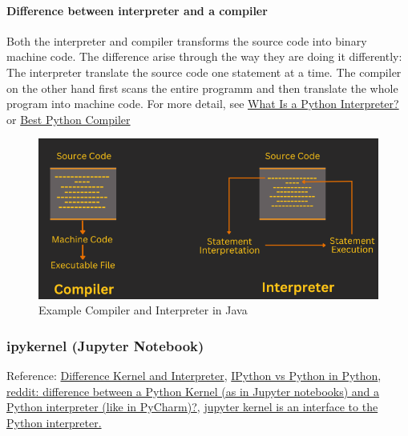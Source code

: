\paragraph{Difference between interpreter and a compiler}
Both the interpreter and compiler transforms the source code into binary machine code.
The difference arise through the way they are doing it differently: The interpreter translate the source code one statement at a time. The compiler on the other hand first scans the entire programm and then translate the whole program into machine code. For more detail, see \href{https://blog.hubspot.com/website/what-is-python-interpreter#:~:text=A%20python%20interpreter%20is%20a,and%20low%2Dlevel%20languages%20are.}{What Is a Python Interpreter?} or \href{https://www.analyticsvidhya.com/blog/2021/05/choose-best-python-compilers-for-your-machine-learning-project-detailed-overview/#:~:text=What%20is%20a%20Python%20compiler,executed%20directly%20by%20a%20computer.}{Best Python Compiler}
\begin{figure}[H]
	\centering
	\includegraphics[scale = 0.3]{attachment/chapter_AML/Scc004}
	\caption{Example Compiler and Interpreter in Java}
\end{figure}

\subsubsection{ipykernel (Jupyter Notebook)}
Reference: \href{https://www.reddit.com/r/learnprogramming/comments/imhxai/what_is_the_difference_between_a_python_kernel_as/#:~:text=Python%20kernel%20is%20just%20a,is%20also%20not%20an%20interpreter.}{Difference Kernel and Interpreter}, \href{https://plotly.com/python/ipython-vs-python/}{IPython vs Python in Python}, \href{https://www.reddit.com/r/learnprogramming/comments/imhxai/what_is_the_difference_between_a_python_kernel_as/#:~:text=Python%20kernel%20is%20just%20a,is%20also%20not%20an%20interpreter.}{reddit:  difference between a Python Kernel (as in Jupyter notebooks) and a Python interpreter (like in PyCharm)?}, \href{https://python-forum.io/thread-40721.html}{jupyter kernel is an interface to the Python interpreter.} 
\\


